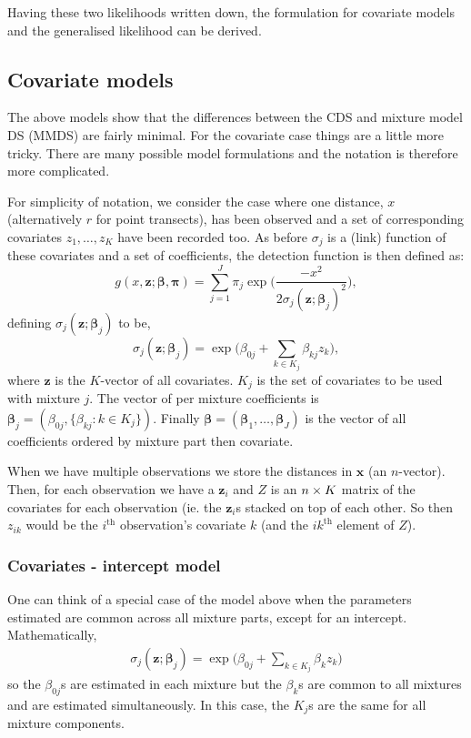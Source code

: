 Having these two likelihoods written down, the formulation for covariate models and the generalised likelihood can be derived.

\subsection{Covariate models}
The above models show that the differences between the CDS and mixture model DS (MMDS) are fairly minimal. For the covariate case things are a little more tricky. There are many possible model formulations and the notation is therefore more complicated.

For simplicity of notation, we consider the case where one distance, $x$ (alternatively $r$ for point transects), has been observed and a set of corresponding covariates $z_1,\dots,z_K$ have been recorded too. As before $\sigma_j$ is a (link) function of these covariates and a set of coefficients, the detection function is then defined as:
\begin{equation*}
g(x, \bm{z};\bm{\beta},\bm{\pi}) = \sum_{j=1}^J \pi_j \exp \Big( \frac{-x^2}{2 \sigma_j(\bm{z};\bm{\beta}_j)^2}\Big),
\end{equation*}
defining $\sigma_j(\bm{z};\bm{\beta}_j)$ to be,
\begin{equation*}
\sigma_j(\bm{z};\bm{\beta}_j) = \exp \Big(\beta_{0j} + \sum_{k\in K_j} \beta_{kj} z_k \Big),
\end{equation*}
where $\bm{z}$ is the $K$-vector of all covariates. $K_j$ is the set of covariates to be used with mixture $j$. The vector of per mixture coefficients is $\bm{\beta}_j=(\beta_{0j},\{ \beta_{kj} : k \in K_j\})$. Finally $\bm{\beta}=(\bm{\beta}_1,\dots,\bm{\beta}_J)$ is the vector of all coefficients ordered by mixture part then covariate.

When we have multiple observations we store the distances in $\bm{x}$ (an $n$-vector). Then, for each observation we have a $\bm{z}_i$ and $Z$ is an $n \times K$ matrix of the covariates for each observation (ie. the $\bm{z}_i$s stacked on top of each other. So then $z_{ik}$ would be the $i^\text{th}$ observation's covariate $k$ (and the $ik^\text{th}$ element of $Z$).

\subsubsection{Covariates - intercept model}

One can think of a special case of the model above when the parameters estimated are common across all mixture parts, except for an intercept.  Mathematically,
\begin{align*}
\sigma_j(\bm{z};\bm{\beta}_j) = \exp \Big(\beta_{0j} + \sum_{k\in K_j} \beta_{k} z_k \Big)
\end{align*}
so the $\beta_{0j}$s are estimated in each mixture but the $\beta_{k}$s are common to all mixtures and are estimated simultaneously. In this case, the $K_j$s are the same for all mixture components.

